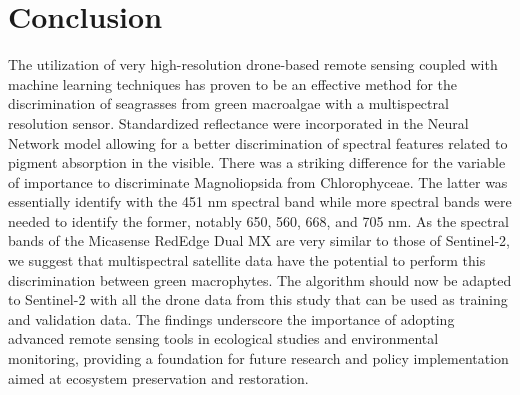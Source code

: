 \documentclass[
  number]{elsarticle}
\begin{document}
\section{Conclusion}\label{conclusion}

The utilization of very high-resolution drone-based remote sensing
coupled with machine learning techniques has proven to be an effective
method for the discrimination of seagrasses from green macroalgae with a
multispectral resolution sensor. Standardized reflectance were
incorporated in the Neural Network model allowing for a better
discrimination of spectral features related to pigment absorption in the
visible. There was a striking difference for the variable of importance
to discriminate Magnoliopsida from Chlorophyceae. The latter was
essentially identify with the 451 nm spectral band while more spectral
bands were needed to identify the former, notably 650, 560, 668, and 705
nm. As the spectral bands of the Micasense RedEdge Dual MX are very
similar to those of Sentinel-2, we suggest that multispectral satellite
data have the potential to perform this discrimination between green
macrophytes. The algorithm should now be adapted to Sentinel-2 with all
the drone data from this study that can be used as training and
validation data. The findings underscore the importance of adopting
advanced remote sensing tools in ecological studies and environmental
monitoring, providing a foundation for future research and policy
implementation aimed at ecosystem preservation and restoration.


  
\end{document}
